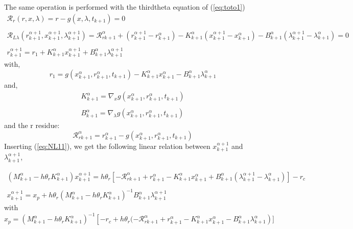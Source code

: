 The same operation is performed with the thirdtheta equation of (\ref{eq:toto1})
\begin{equation}
   \label{eq:NL9}
   \begin{array}{l}
      \mathcal R_r(r,x,\lambda)=r-g(x,\lambda,t_{k+1}) =0\\ \\
      \mathcal R_{L\lambda}(r^{\alpha+1}_{k+1},x^{\alpha+1}_{k+1},\lambda^{\alpha+1}_{k+1}) = \mathcal
      R_{rk+1}^{\alpha} + (r^{\alpha+1}_{k+1} - r^{\alpha}_{k+1}) -
      K^{\alpha}_{k+1}(x^{\alpha+1}_{k+1} - x^{\alpha}_{k+1})- B^{\alpha}_{k+1}(\lambda^{\alpha+1}_{k+1} -
      \lambda^{\alpha}_{k+1})=0\\ \\
      r^{\alpha+1}_{k+1} = r_1 +K^{\alpha}_{k+1}x^{\alpha+1}_{k+1} +B^{\alpha}_{k+1} \lambda^{\alpha+1}_{k+1}       
 \end{array}
\end{equation}
with,
\begin{equation}
r_1 = g(x^{\alpha}_{k+1},r^{\alpha}_{k+1},t_{k+1}) - K^{\alpha}_{k+1} x^{\alpha}_{k+1} -
B^{\alpha}_{k+1} \lambda^{\alpha}_{k+1}
\end{equation}
and,
\begin{equation}
     \begin{array}{l}
  K^{\alpha}_{k+1} = \nabla_xg(x^{\alpha}_{k+1},r^{\alpha}_{k+1},t_{k+1})  \\ \\
  B^{\alpha}_{k+1} = \nabla_{\lambda}g(x^{\alpha}_{k+1},r^{\alpha}_{k+1},t_{k+1})
 \end{array}
\end{equation}
and the r residue:
\begin{equation}
\mathcal
      R_{rk+1}^{\alpha} = r^{\alpha}_{k+1} - g(x^{\alpha}_{k+1},r^{\alpha}_{k+1},t_{k+1})
  \end{equation}
Inserting (\ref{eq:NL11}), we get the following linear relation between $x^{\alpha+1}_{k+1}$ and
$\lambda^{\alpha+1}_{k+1}$, 

\begin{equation}
   \begin{array}{l}
    (M^{\alpha}_{k+1} -h\theta _r K^{\alpha}_{k+1})x^{\alpha+1}_{k+1} = h \theta _r \left[ - \mathcal
      R_{rk+1}^{\alpha} +  r^{\alpha}_{k+1} -K^{\alpha}_{k+1} x^{\alpha}_{k+1}+
      B^{\alpha}_{k+1} (\lambda^{\alpha+1}_{k+1} - \lambda^{\alpha}_{k+1}) \right] -r_c \\ \\
    x^{\alpha+1}_{k+1} =  x_p + h \theta _r (M^{\alpha}_{k+1}- h \theta _r K^{\alpha}_{k+1})^{-1}  B^{\alpha}_{k+1} \lambda^{\alpha+1}_{k+1} 

   \end{array}
\end{equation}
with
\begin{equation}
x_p =  (M^{\alpha}_{k+1} -h \theta _r K^{\alpha}_{k+1})^{-1}  \left[ -r_c + h \theta _r( -\mathcal
      R_{rk+1}^{\alpha} +  r^{\alpha}_{k+1} -K^{\alpha}_{k+1} x^{\alpha}_{k+1}-
      B^{\alpha}_{k+1} \lambda^{\alpha}_{k+1} \right)]
  \end{equation}

